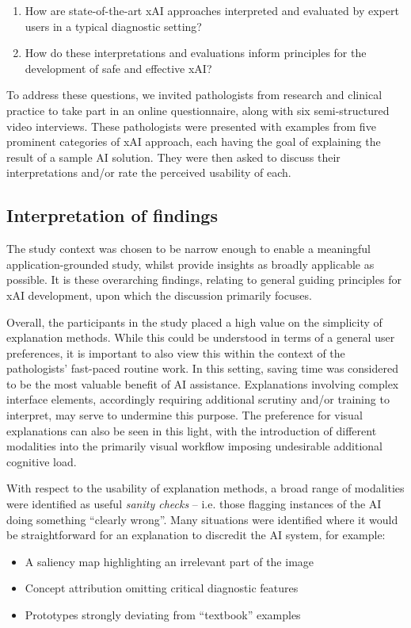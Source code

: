 \documentclass[final,5p,times,twocolumn,hyphens]{elsarticle}
\newcommand{\researchquestions}{
    \begin{enumerate}
        \item How are state-of-the-art xAI approaches interpreted and evaluated by expert users in a typical diagnostic setting?
        \item How do these interpretations and evaluations inform principles for the development of safe and effective xAI?
    \end{enumerate}
}
\begin{document}
\researchquestions

To address these questions, we invited pathologists from research and clinical practice to take part in an online questionnaire, along with six semi-structured video interviews. These pathologists were presented with examples from five prominent categories of xAI approach, each having the goal of explaining the result of a sample AI solution. They were then asked to discuss their interpretations and/or rate the perceived usability of each. 

\subsection{Interpretation of findings}

The study context was chosen to be narrow enough to enable a meaningful application-grounded study, whilst provide insights as broadly applicable as possible. It is these overarching findings, relating to general guiding principles for xAI development, upon which the discussion primarily focuses.

Overall, the participants in the study placed a high value on the simplicity of explanation methods. While this could be understood in terms of a general user preferences, it is important to also view this within the context of the pathologists' fast-paced routine work. In this setting, saving time was considered to be the most valuable benefit of AI assistance. Explanations involving complex interface elements, accordingly requiring additional scrutiny and/or training to interpret, may serve to undermine this purpose. The preference for visual explanations can also be seen in this light, with the introduction of different modalities into the primarily visual workflow imposing undesirable additional cognitive load.

With respect to the usability of explanation methods, a broad range of modalities were identified as useful \textit{sanity checks} -- i.e. those flagging instances of the AI doing something ``clearly wrong''. Many situations were identified where it would be straightforward for an explanation to discredit the AI system, for example: 

\begin{itemize}
    \setlength{\itemsep}{1pt}
    \item A saliency map highlighting an irrelevant part of the image
    \item Concept attribution omitting critical diagnostic features
    \item Prototypes strongly deviating from ``textbook'' examples
\end{itemize}
\end{document}
